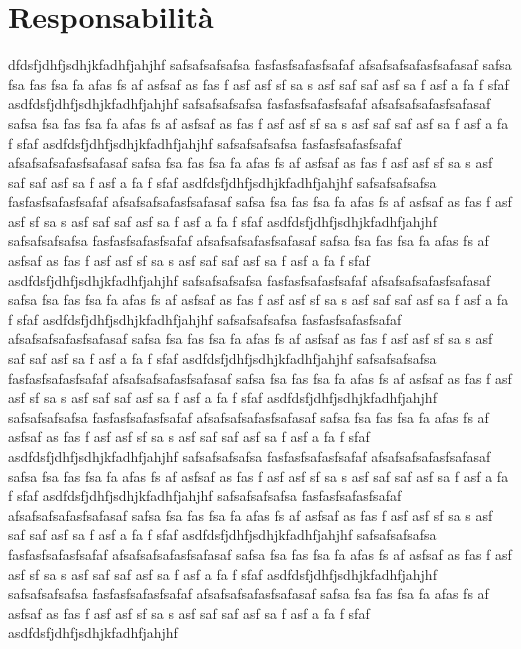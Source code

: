 \section{Responsabilità}
dfdsfjdhfjsdhjkfadhfjahjhf
safsafsafsafsa
fasfasfsafasfsafaf
afsafsafsafasfsafasaf safsa fsa fas fsa fa afas fs af asfsaf as fas f asf asf sf sa s asf saf saf asf sa f asf a fa f sfaf asdfdsfjdhfjsdhjkfadhfjahjhf
safsafsafsafsa
fasfasfsafasfsafaf
afsafsafsafasfsafasaf safsa fsa fas fsa fa afas fs af asfsaf as fas f asf asf sf sa s asf saf saf asf sa f asf a fa f sfaf asdfdsfjdhfjsdhjkfadhfjahjhf
safsafsafsafsa
fasfasfsafasfsafaf
afsafsafsafasfsafasaf safsa fsa fas fsa fa afas fs af asfsaf as fas f asf asf sf sa s asf saf saf asf sa f asf a fa f sfaf asdfdsfjdhfjsdhjkfadhfjahjhf
safsafsafsafsa
fasfasfsafasfsafaf
afsafsafsafasfsafasaf safsa fsa fas fsa fa afas fs af asfsaf as fas f asf asf sf sa s asf saf saf asf sa f asf a fa f sfaf asdfdsfjdhfjsdhjkfadhfjahjhf
safsafsafsafsa
fasfasfsafasfsafaf
afsafsafsafasfsafasaf safsa fsa fas fsa fa afas fs af asfsaf as fas f asf asf sf sa s asf saf saf asf sa f asf a fa f sfaf asdfdsfjdhfjsdhjkfadhfjahjhf
safsafsafsafsa
fasfasfsafasfsafaf
afsafsafsafasfsafasaf safsa fsa fas fsa fa afas fs af asfsaf as fas f asf asf sf sa s asf saf saf asf sa f asf a fa f sfaf asdfdsfjdhfjsdhjkfadhfjahjhf
safsafsafsafsa
fasfasfsafasfsafaf
afsafsafsafasfsafasaf safsa fsa fas fsa fa afas fs af asfsaf as fas f asf asf sf sa s asf saf saf asf sa f asf a fa f sfaf asdfdsfjdhfjsdhjkfadhfjahjhf
safsafsafsafsa
fasfasfsafasfsafaf
afsafsafsafasfsafasaf safsa fsa fas fsa fa afas fs af asfsaf as fas f asf asf sf sa s asf saf saf asf sa f asf a fa f sfaf asdfdsfjdhfjsdhjkfadhfjahjhf
safsafsafsafsa
fasfasfsafasfsafaf
afsafsafsafasfsafasaf safsa fsa fas fsa fa afas fs af asfsaf as fas f asf asf sf sa s asf saf saf asf sa f asf a fa f sfaf asdfdsfjdhfjsdhjkfadhfjahjhf
safsafsafsafsa
fasfasfsafasfsafaf
afsafsafsafasfsafasaf safsa fsa fas fsa fa afas fs af asfsaf as fas f asf asf sf sa s asf saf saf asf sa f asf a fa f sfaf asdfdsfjdhfjsdhjkfadhfjahjhf
safsafsafsafsa
fasfasfsafasfsafaf
afsafsafsafasfsafasaf safsa fsa fas fsa fa afas fs af asfsaf as fas f asf asf sf sa s asf saf saf asf sa f asf a fa f sfaf asdfdsfjdhfjsdhjkfadhfjahjhf
safsafsafsafsa
fasfasfsafasfsafaf
afsafsafsafasfsafasaf safsa fsa fas fsa fa afas fs af asfsaf as fas f asf asf sf sa s asf saf saf asf sa f asf a fa f sfaf asdfdsfjdhfjsdhjkfadhfjahjhf
safsafsafsafsa
fasfasfsafasfsafaf
afsafsafsafasfsafasaf safsa fsa fas fsa fa afas fs af asfsaf as fas f asf asf sf sa s asf saf saf asf sa f asf a fa f sfaf asdfdsfjdhfjsdhjkfadhfjahjhf
